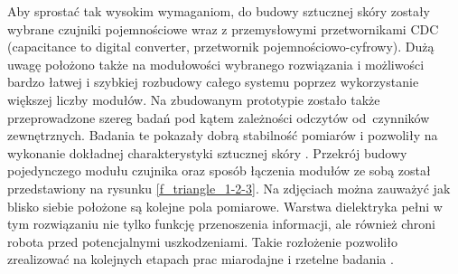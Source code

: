 Aby sprostać tak wysokim wymaganiom, do budowy sztucznej skóry zostały wybrane czujniki pojemnościowe wraz z przemysłowymi przetwornikami CDC (capacitance to digital converter, przetwornik pojemnościowo-cyfrowy). Dużą uwagę położono także na modułowości wybranego rozwiązania i możliwości bardzo łatwej i szybkiej rozbudowy całego systemu poprzez wykorzystanie większej liczby modułów. Na zbudowanym prototypie zostało także przeprowadzone szereg badań pod kątem zależności odczytów od~czynników zewnętrznych. Badania te pokazały dobrą stabilność pomiarów i pozwoliły na wykonanie dokładnej charakterystyki sztucznej skóry 
\cite{b_article_wloch_4_wytrzymalosc, b_konf_wloch_1_opis_budowy}. Przekrój budowy pojedynczego modułu czujnika oraz sposób łączenia modułów ze sobą został przedstawiony na rysunku \ref{f_triangle_1-2-3}. Na zdjęciach można zauważyć jak blisko siebie położone są kolejne pola pomiarowe. Warstwa dielektryka pełni w tym rozwiązaniu nie tylko funkcję przenoszenia informacji, ale również chroni robota przed potencjalnymi uszkodzeniami. Takie rozłożenie pozwoliło zrealizować na kolejnych etapach prac miarodajne i rzetelne badania \cite{b_konf_wloch_1_opis_budowy}.

